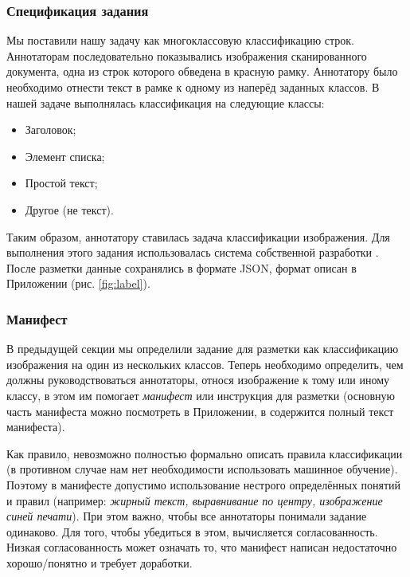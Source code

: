     \subsubsection{Спецификация задания}
        Мы поставили нашу задачу как многоклассовую классификацию строк. Аннотаторам последовательно показывались изображения сканированного документа, одна из строк которого обведена в красную рамку. Аннотатору было необходимо отнести текст в рамке к одному из наперёд заданных классов. В нашей задаче выполнялась классификация на следующие классы: 
        \begin{itemize}
            \item Заголовок;
            \item Элемент списка;
            \item Простой текст;
            \item Другое (не текст). 
        \end{itemize}
        Таким образом, аннотатору ставилась задача классификации изображения. Для выполнения этого задания использовалась система собственной разработки \cite{labeler}. После разметки данные сохранялись в формате JSON, формат описан в Приложении (рис. \ref{fig:label}).
        
    \subsubsection{Манифест}
        В предыдущей секции мы определили задание для разметки как классификацию изображения на один из 
        нескольких классов. Теперь необходимо определить, чем должны руководствоваться аннотаторы, относя 
        изображение к тому или иному классу, в этом им помогает \textit{манифест} или инструкция для разметки (основную часть манифеста можно посмотреть в Приложении, в \cite{data} содержится полный текст манифеста).
        
        Как правило, невозможно полностью формально описать правила классификации (в противном случае нам нет необходимости использовать машинное обучение). 
        Поэтому в манифесте допустимо использование нестрого определённых понятий  и правил (например: \textit{жирный текст, выравнивание по центру, изображение синей печати}). При этом важно, чтобы все аннотаторы понимали задание одинаково. Для того, чтобы убедиться в этом, вычисляется согласованность. 
        Низкая согласованность может означать то, что манифест написан недостаточно хорошо/понятно и требует 
        доработки. 
        
